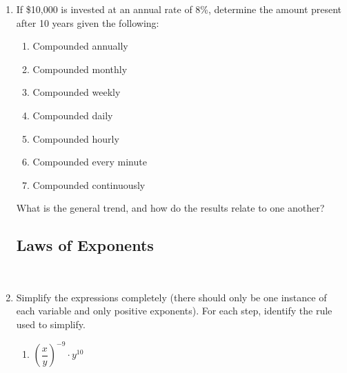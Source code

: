 \begin{enumerate}
\item If \$10,000 is invested at an annual rate of 8\%, determine the
  amount present after 10 years given the following:

\begin{enumerate}
\item Compounded annually\vfill
\item Compounded monthly \vfill
\item Compounded weekly \vfill
\item Compounded daily \vfill
\item Compounded hourly \vfill
\item Compounded every minute \vfill
\item Compounded continuously\vfill
\end{enumerate}

What is the general trend, and how do the results relate to one
another?

\clearpage

\subsection{Laws of Exponents} ~

\noindent
{}



\item Simplify the expressions completely (there should only be one
  instance of each variable and only positive exponents). For each
  step, identify the rule used to simplify.

\begin{enumerate}
\item $\left(\dfrac{x}{y}\right)^{-9}\cdot y^{10}$

  \vfill


\end{enumerate}
\end{enumerate}
